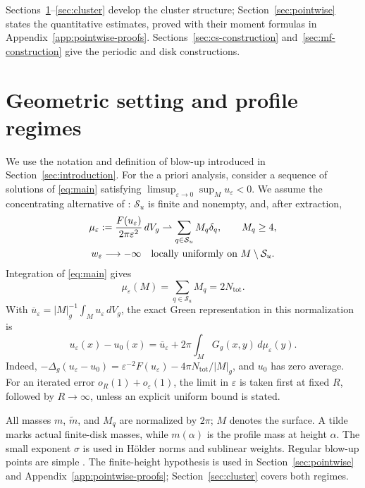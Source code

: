 \documentclass[11pt,reqno]{amsart}
\numberwithin{equation}{section}
\theoremstyle{definition}
\theoremstyle{remark}
\newcommand{\cS}{\mathcal S}
\newcommand{\eps}{\varepsilon}
\newcommand{\tot}{\mathrm{tot}}
\begin{document}
Sections~\ref{sec:setting}--\ref{sec:cluster} develop the cluster
structure; Section~\ref{sec:pointwise} states the quantitative estimates,
proved with their moment formulas in Appendix~\ref{app:pointwise-proofs}.
Sections~\ref{sec:cs-construction} and~\ref{sec:mf-construction}
give the periodic and disk constructions.

\section{Geometric setting and profile regimes}\label{sec:setting}
We use the notation and definition of blow-up introduced in
Section~\ref{sec:introduction}. For the a priori analysis, consider
a sequence of solutions of \eqref{eq:main} satisfying
\( \limsup_{\eps\to0}\sup_Mu_\eps<0.
\)
We assume the concentrating alternative of \cite{ChoeKim,LinYanAIHP}:
$\cS_u$ is finite and nonempty, and, after extraction,
\begin{gather}
 \mu_\eps:=\frac{F(u_\eps)}{2\pi\eps^2}\,dV_g
 \rightharpoonup\sum_{q\in\cS_u}M_q\delta_q,\qquad M_q\ge4,
 \label{eq:measure-limit}\\
 w_\eps\longrightarrow-\infty
 \quad\text{locally uniformly on }M\setminus\cS_u.\notag
\end{gather}
Integration of \eqref{eq:main} gives
\begin{equation}\label{eq:global-mass}
 \mu_\eps(M)=\sum_{q\in\cS_u}M_q=2N_{\tot}.
\end{equation}
With $\overline u_\eps=|M|_g^{-1}\int_Mu_\eps\,dV_g$, the exact
Green representation in this normalization is
\begin{equation}\label{eq:global-green-representation}
 u_\eps(x)-u_0(x)=\overline u_\eps
                +2\pi\int_M G_g(x,y)\,d\mu_\eps(y).
\end{equation}
Indeed, $-\Delta_g(u_\eps-u_0)=\eps^{-2}F(u_\eps)
-4\pi N_{\tot}/|M|_g$, and $u_0$ has zero average.
For an iterated error $o_R(1)+o_\eps(1)$, the limit in $\eps$ is
taken first at fixed $R$, followed by $R\to\infty$, unless an
explicit uniform bound is stated.

All masses $m$, $\widetilde m$, and $M_q$ are normalized by $2\pi$;
$M$ denotes the surface. A tilde marks actual finite-disk masses,
while $m(\alpha)$ is the profile mass at height $\alpha$.
The small exponent $\sigma$ is used in H\"older norms and sublinear weights.
Regular blow-up points are simple \cite{ChoeKim,LinYanAIHP}.
The finite-height hypothesis is used in Section~\ref{sec:pointwise}
and Appendix~\ref{app:pointwise-proofs}; Section~\ref{sec:cluster}
covers both regimes.
\end{document}
